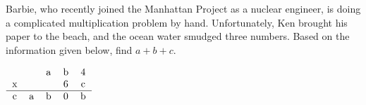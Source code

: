Barbie, who recently joined the Manhattan Project as a nuclear engineer, is doing a complicated multiplication problem by hand. Unfortunately, Ken brought his paper to the beach, and the ocean water smudged three numbers. Based on the information given below, find $a + b + c$.



$\begin{tabular}{ccccc}
 &  & a & b & 4 \\
x &  &  & 6 & c \\
\hline
c & a & b & 0 & b \\
\end{tabular}$
